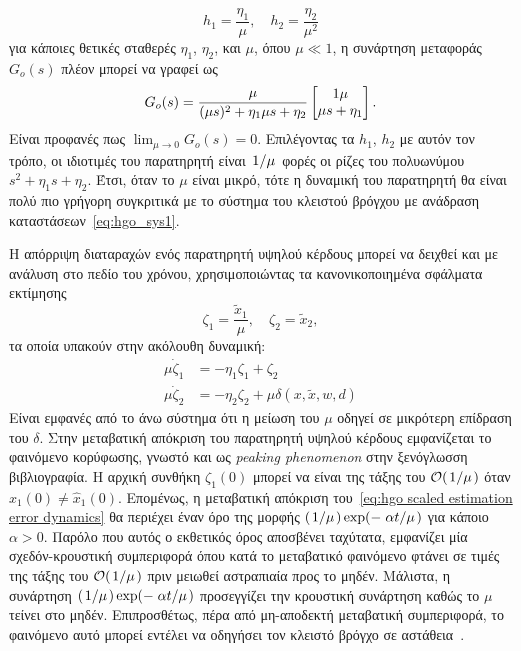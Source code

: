 \[
    h_1 = \frac{\eta_1}{\mu},\quad h_2 = \frac{\eta_2}{\mu^2}
\]
για κάποιες θετικές σταθερές $\eta_1$, $\eta_2$, και $\mu$, όπου $\mu \ll 1$, η συνάρτηση μεταφοράς $G_o(s)$ πλέον μπορεί να γραφεί ως
\[
    G_o(s) = \frac{\mu}{(\mu s)^2 + \eta_1 \mu s + \eta_2} \bmqty{1\mu \\ \mu s + \eta_1}.
\]
Είναι προφανές πως $\lim_{\mu \rightarrow 0} G_o(s) = 0$. Επιλέγοντας τα $h_1$, $h_2$ με αυτόν τον τρόπο, οι ιδιοτιμές του παρατηρητή είναι $\flatfrac{1}{\mu}$ φορές οι ρίζες του πολυωνύμου $s^2 + \eta_1 s + \eta_2$. Έτσι, όταν το $\mu$ είναι μικρό, τότε η δυναμική του παρατηρητή θα είναι πολύ πιο γρήγορη συγκριτικά με το σύστημα του κλειστού βρόγχου με ανάδραση καταστάσεων~\eqref{eq:hgo_sys1}.

H απόρριψη διαταραχών ενός παρατηρητή υψηλού κέρδους μπορεί να δειχθεί και με ανάλυση στο πεδίο του χρόνου, χρησιμοποιώντας τα κανονικοποιημένα σφάλματα εκτίμησης
\[
    \zeta_1 = \frac{\tilde{x}_1}{\mu},\quad \zeta_2 = \tilde x_2,
\]
τα οποία υπακούν στην ακόλουθη δυναμική:
\begin{equation}
    \label{eq:hgo scaled estimation error dynamics}          
    \begin{split}
        \mu \dot \zeta_1 & = - \eta_1 \zeta_1 + \zeta_2\\
        \mu \dot \zeta_2 & = - \eta_2 \zeta_2 + \mu \delta(x, \tilde x, w, d)
    \end{split}
\end{equation}
Είναι εμφανές από το άνω σύστημα ότι η μείωση του $\mu$ οδηγεί σε μικρότερη επίδραση του $\delta$. Στην μεταβατική απόκριση του παρατηρητή υψηλού κέρδους εμφανίζεται το φαινόμενο κορύφωσης, γνωστό και ως \emph{\textlatin{peaking phenomenon}} στην ξενόγλωσση βιβλιογραφία. Η αρχική συνθήκη $\zeta_1(0)$ μπορεί να είναι της τάξης του $\bigo{\flatfrac{1}{\mu}}$ όταν $x_1(0) \neq \hat x_1(0)$. Επομένως, η μεταβατική απόκριση του~\eqref{eq:hgo scaled estimation error dynamics} θα περιέχει έναν όρο της μορφής $(\flatfrac{1}{\mu})\exp(- \flatfrac{\alpha t}{\mu})$ για κάποιο $\alpha > 0$. Παρόλο που αυτός ο εκθετικός όρος αποσβένει ταχύτατα, εμφανίζει μία σχεδόν-κρουστική συμπεριφορά όπου κατά το μεταβατικό φαινόμενο φτάνει σε τιμές της τάξης του $\bigo{\flatfrac{1}{\mu}}$ πριν μειωθεί αστραπιαία προς το μηδέν. Μάλιστα, η συνάρτηση $(\flatfrac{1}{\mu})\exp(- \flatfrac{\alpha t}{\mu})$ προσεγγίζει την κρουστική συνάρτηση καθώς το $\mu$ τείνει στο μηδέν. Επιπροσθέτως, πέρα από μη-αποδεκτή μεταβατική συμπεριφορά, το φαινόμενο αυτό μπορεί εντέλει να οδηγήσει τον κλειστό βρόγχο σε αστάθεια~\cite{Esfandiari1992}.

